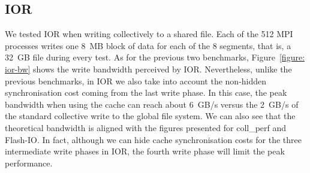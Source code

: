 \subsection{IOR}
\label{subsec: ior}
We tested IOR when writing collectively to a shared file. Each of the 512 MPI processes writes one 8~MB block of data for each of the 8 segments, that is, a 32~GB file during every test.
As for the previous two benchmarks, Figure~\ref{figure: ior-bw} shows the write bandwidth perceived by IOR. Nevertheless, unlike the previous benchmarks, in IOR we also take into account the non-hidden synchronisation cost coming from the last write phase. 
In this case, the peak bandwidth when using the cache can reach about 6~GB/s versus the 2~GB/s of the standard collective write to the global file system. We can also see that the theoretical bandwidth is aligned with the figures presented for coll\_perf and 
Flash-IO. In fact, although we can hide cache synchronisation costs for the three intermediate write phases in IOR, the fourth write phase will limit the peak performance.

